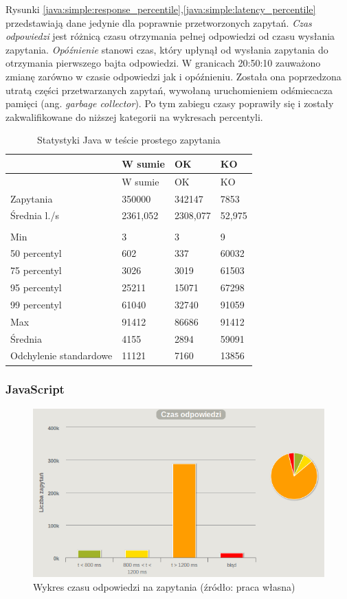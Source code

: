 \documentclass[12pt,twoside]{article}
\begin{document}
Rysunki
\ref{java:simple:response_percentile},\ref{java:simple:latency_percentile}
przedstawiają dane jedynie dla poprawnie przetworzonych zapytań.
\emph{Czas odpowiedzi} jest różnicą czasu otrzymania pełnej odpowiedzi
od czasu wysłania zapytania. \emph{Opóźnienie} stanowi czas, który
upłynął od wysłania zapytania do otrzymania pierwszego bajta odpowiedzi.
W granicach 20:50:10 zauważono zmianę zarówno w czasie odpowiedzi jak i
opóźnieniu. Została ona poprzedzona utratą części przetwarzanych
zapytań, wywołaną uruchomieniem odśmiecacza pamięci (ang. \emph{garbage
collector}). Po tym zabiegu czasy poprawiły się i zostały
zakwalifikowane do niższej kategorii na wykresach percentyli.

\begin{longtable}[c]{@{}llll@{}}
\caption{Statystyki Java w teście prostego zapytania}\tabularnewline
\toprule
& W sumie & OK & KO\tabularnewline
\midrule
\endfirsthead
\toprule
& W sumie & OK & KO\tabularnewline
\midrule
\endhead
Zapytania & 350000 & 342147 & 7853\tabularnewline
Średnia l./s & 2361,052 & 2308,077 & 52,975\tabularnewline
& & &\tabularnewline
Min & 3 & 3 & 9\tabularnewline
50 percentyl & 602 & 337 & 60032\tabularnewline
75 percentyl & 3026 & 3019 & 61503\tabularnewline
95 percentyl & 25211 & 15071 & 67298\tabularnewline
99 percentyl & 61040 & 32740 & 91059\tabularnewline
Max & 91412 & 86686 & 91412\tabularnewline
Średnia & 4155 & 2894 & 59091\tabularnewline
Odchylenie standardowe & 11121 & 7160 & 13856\tabularnewline
\bottomrule
\end{longtable}

\subsubsection{JavaScript}\label{javascript}

\begin{figure}[htbp]
\centering
\includegraphics[resolution=150]{test_results/js/simpletest/screenshots/response_times.png}
\caption{Wykres czasu odpowiedzi na zapytania (źródło: praca własna)}
\end{figure}
\end{document}
